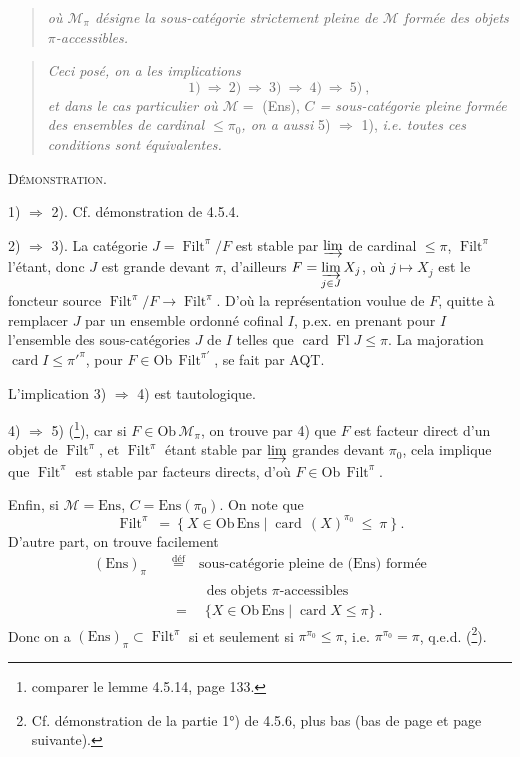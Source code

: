 \documentclass[11pt]{article}
\newcommand{\printedpage}[1]{\if\relax\detokenize{#1}\relax\else\marginpar{\footnotesize p.~#1}\fi}
\newcommand{\msp}[1]{\marginpar{\footnotesize [#1]}}
\newcommand{\Ens}{\mathrm{Ens}}
\newcommand{\Ob}{\mathrm{Ob}\,}
\newcommand{\card}{\operatorname{card}}
\newcommand{\Fl}{\operatorname{Fl}}
\newcommand{\Filt}{\operatorname{Filt}}
\begin{document}
\printedpage{34}

\msp{page 117}

\begin{quote}
\textit{où $\mathcal{M}_\pi$ désigne la sous-catégorie strictement pleine de $\mathcal{M}$ formée des objets $\pi$-accessibles.}
\end{quote}

\begin{quote}
\textit{Ceci posé, on a les implications}
\[
\mathrm{1)} \ \Longrightarrow\ \mathrm{2)} \ \Longrightarrow\ \mathrm{3)} \ \Longrightarrow\ \mathrm{4)} \ \Longrightarrow\ \mathrm{5)} \ ,
\]
\textit{et dans le cas particulier où $\mathcal{M} = $} (Ens), \textit{$C$ = sous-catégorie pleine formée des ensembles de cardinal $\leqslant \pi_0$, on a aussi} 5) $\Longrightarrow$ 1), \textit{i.e. toutes ces conditions sont équivalentes.}
\end{quote}

\textsc{Démonstration.}

1) $\Longrightarrow$ 2). Cf. démonstration de 4.5.4.

2) $\Longrightarrow$ 3). La catégorie $J = \Filt^\pi/F$ est stable par $\varinjlim$ de cardinal $\leqslant \pi$, $\Filt^\pi$ l'étant, donc $J$ est grande devant $\pi$, d'ailleurs $F = \varinjlim\limits_{j\in J} X_j$, où $j \longmapsto X_j$ est le foncteur source $\Filt^\pi/F \longrightarrow \Filt^\pi$. D'où la représentation voulue de $F$, quitte à remplacer $J$ par un ensemble ordonné cofinal $I$, p.ex. en prenant pour $I$ l'ensemble des sous-catégories $J$ de $I$ telles que $\card \Fl J \leqslant \pi$. La majoration $\card I \leqslant \pi'^{\pi}$, pour $F \in \Ob \Filt^{\pi'}$, se fait par AQT.

L'implication 3) $\Longrightarrow$ 4) est tautologique.

4) $\Longrightarrow$ 5) (\footnote{comparer le lemme 4.5.14, page 133.}), car si $F \in \Ob \mathcal{M}_\pi$, on trouve par 4) que $F$ est facteur direct d'un objet de $\Filt^\pi$, et $\Filt^\pi$ étant stable par $\varinjlim$
\msp{page 118}
grandes devant $\pi_0$, cela implique que $\Filt^\pi$ est stable par facteurs directs, d'où $F \in \Ob \Filt^\pi$.

Enfin, si $\mathcal{M} = \Ens$, $C = \Ens(\pi_0)$. On note que
\[
\Filt^\pi \ = \ \{ \ X \in \Ob \Ens \mid \card\,(X)^{\pi_0} \ \leqslant \ \pi \ \} \ .
\]
D'autre part, on trouve facilement
\[
\begin{aligned}
(\Ens)_\pi \quad &\overset{\text{déf}}{=} \quad \text{sous-catégorie pleine de (Ens) formée} \\
&\phantom{\overset{\text{déf}}{=}} \quad \text{des objets $\pi$-accessibles} \\
&= \quad \{ X \in \Ob \Ens \mid \card X \leqslant \pi \} \ .
\end{aligned}
\]
Donc on a $(\Ens)_\pi \subset \Filt^\pi$ si et seulement si $\pi^{\pi_0} \leqslant \pi$, i.e. $\pi^{\pi_0} = \pi$, q.e.d. (\footnote{Cf. démonstration de la partie 1°) de 4.5.6, plus bas (bas de page et page suivante).}).
\end{document}
